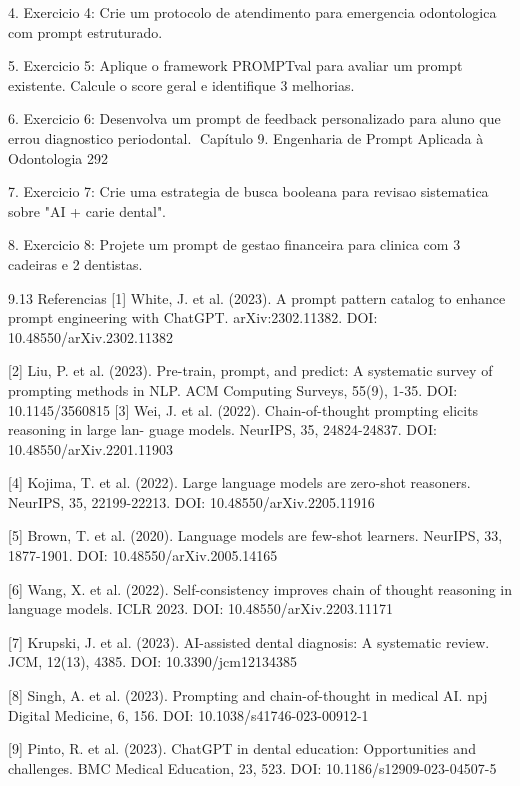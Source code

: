      4. Exercicio 4: Crie um protocolo de atendimento para emergencia odontologica
        com prompt estruturado.

     5. Exercicio 5: Aplique o framework PROMPTval para avaliar um prompt existente.
        Calcule o score geral e identifique 3 melhorias.

     6. Exercicio 6: Desenvolva um prompt de feedback personalizado para aluno que
        errou diagnostico periodontal.
Capítulo 9. Engenharia de Prompt Aplicada à Odontologia                               292


  7. Exercicio 7: Crie uma estrategia de busca booleana para revisao sistematica
     sobre "AI + carie dental".

  8. Exercicio 8: Projete um prompt de gestao financeira para clinica com 3 cadeiras
     e 2 dentistas.


9.13      Referencias
  [1] White, J. et al. (2023). A prompt pattern catalog to enhance prompt engineering
      with ChatGPT. arXiv:2302.11382. DOI: 10.48550/arXiv.2302.11382

  [2] Liu, P. et al. (2023). Pre-train, prompt, and predict: A systematic survey
      of prompting methods in NLP. ACM Computing Surveys, 55(9), 1-35. DOI:
      10.1145/3560815
  [3] Wei, J. et al. (2022). Chain-of-thought prompting elicits reasoning in large lan-
      guage models. NeurIPS, 35, 24824-24837. DOI: 10.48550/arXiv.2201.11903

  [4] Kojima, T. et al. (2022). Large language models are zero-shot reasoners. NeurIPS,
      35, 22199-22213. DOI: 10.48550/arXiv.2205.11916

  [5] Brown, T. et al. (2020). Language models are few-shot learners. NeurIPS, 33,
      1877-1901. DOI: 10.48550/arXiv.2005.14165

  [6] Wang, X. et al. (2022). Self-consistency improves chain of thought reasoning in
      language models. ICLR 2023. DOI: 10.48550/arXiv.2203.11171

  [7] Krupski, J. et al. (2023). AI-assisted dental diagnosis: A systematic review. JCM,
      12(13), 4385. DOI: 10.3390/jcm12134385

  [8] Singh, A. et al. (2023). Prompting and chain-of-thought in medical AI. npj Digital
      Medicine, 6, 156. DOI: 10.1038/s41746-023-00912-1

  [9] Pinto, R. et al. (2023). ChatGPT in dental education: Opportunities and challenges.
      BMC Medical Education, 23, 523. DOI: 10.1186/s12909-023-04507-5

